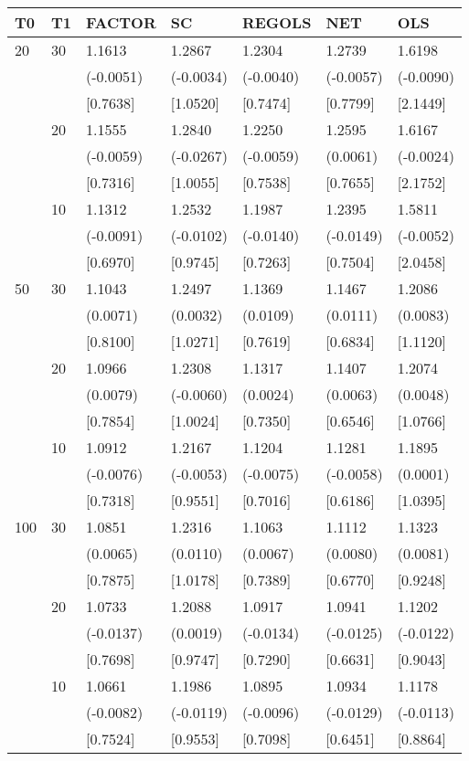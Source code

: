 \begin{table}[ht]
\centering
\begin{tabular}{lllllll}
\hline
T0&T1&FACTOR&SC&REGOLS&NET&OLS\\
\hline
20&30&1.1613&1.2867&1.2304&1.2739&1.6198\\
&&(-0.0051)&(-0.0034)&(-0.0040)&(-0.0057)&(-0.0090)\\
&&[0.7638]&[1.0520]&[0.7474]&[0.7799]&[2.1449]\\
&20&1.1555&1.2840&1.2250&1.2595&1.6167\\
&&(-0.0059)&(-0.0267)&(-0.0059)&(0.0061)&(-0.0024)\\
&&[0.7316]&[1.0055]&[0.7538]&[0.7655]&[2.1752]\\
&10&1.1312&1.2532&1.1987&1.2395&1.5811\\
&&(-0.0091)&(-0.0102)&(-0.0140)&(-0.0149)&(-0.0052)\\
&&[0.6970]&[0.9745]&[0.7263]&[0.7504]&[2.0458]\\

50&30&1.1043&1.2497&1.1369&1.1467&1.2086\\
&&(0.0071)&(0.0032)&(0.0109)&(0.0111)&(0.0083)\\
&&[0.8100]&[1.0271]&[0.7619]&[0.6834]&[1.1120]\\
&20&1.0966&1.2308&1.1317&1.1407&1.2074\\
&&(0.0079)&(-0.0060)&(0.0024)&(0.0063)&(0.0048)\\
&&[0.7854]&[1.0024]&[0.7350]&[0.6546]&[1.0766]\\
&10&1.0912&1.2167&1.1204&1.1281&1.1895\\
&&(-0.0076)&(-0.0053)&(-0.0075)&(-0.0058)&(0.0001)\\
&&[0.7318]&[0.9551]&[0.7016]&[0.6186]&[1.0395]\\

100&30&1.0851&1.2316&1.1063&1.1112&1.1323\\
&&(0.0065)&(0.0110)&(0.0067)&(0.0080)&(0.0081)\\
&&[0.7875]&[1.0178]&[0.7389]&[0.6770]&[0.9248]\\
&20&1.0733&1.2088&1.0917&1.0941&1.1202\\
&&(-0.0137)&(0.0019)&(-0.0134)&(-0.0125)&(-0.0122)\\
&&[0.7698]&[0.9747]&[0.7290]&[0.6631]&[0.9043]\\
&10&1.0661&1.1986&1.0895&1.0934&1.1178\\
&&(-0.0082)&(-0.0119)&(-0.0096)&(-0.0129)&(-0.0113)\\
&&[0.7524]&[0.9553]&[0.7098]&[0.6451]&[0.8864]\\
\hline
\end{tabular}
\end{table}

